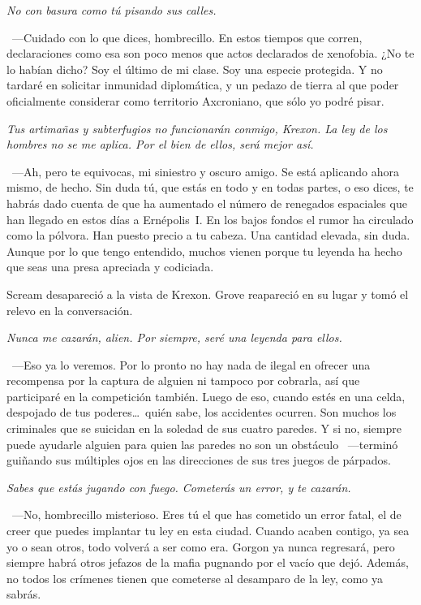 \emph{No con basura como tú pisando sus calles.}

~---Cuidado con lo que dices, hombrecillo. En estos tiempos que corren, declaraciones como esa son poco menos que actos declarados de xenofobia. ¿No te lo habían dicho? Soy el último de mi clase. Soy una especie protegida. Y no tardaré en solicitar inmunidad diplomática, y un pedazo de tierra al que poder oficialmente considerar como territorio Axcroniano, que sólo yo podré pisar.

\emph{Tus artimañas y subterfugios no funcionarán conmigo, Krexon. La ley de los hombres no se me aplica. Por el bien de ellos, será mejor así.}

~---Ah, pero te equivocas, mi siniestro y oscuro amigo. Se está aplicando ahora mismo, de hecho. Sin duda tú, que estás en todo y en todas partes, o eso dices, te habrás dado cuenta de que ha aumentado el número de renegados espaciales que han llegado en estos días a Ernépolis~I. En los bajos fondos el rumor ha circulado como la pólvora. Han puesto precio a tu cabeza. Una cantidad elevada, sin duda. Aunque por lo que tengo entendido, muchos vienen porque tu leyenda ha hecho que seas una presa apreciada y codiciada.

Scream desapareció a la vista de Krexon. Grove reapareció en su lugar y tomó el relevo en la conversación.

\emph{Nunca me cazarán, alien. Por siempre, seré una leyenda para ellos.}

~---Eso ya lo veremos. Por lo pronto no hay nada de ilegal en ofrecer una recompensa por la captura de alguien ni tampoco por cobrarla, así que participaré en la competición también. Luego de eso, cuando estés en una celda, despojado de tus poderes\dots\ quién sabe, los accidentes ocurren. Son muchos los criminales que se suicidan en la soledad de sus cuatro paredes. Y si no, siempre puede ayudarle alguien para quien las paredes no son un obstáculo ~---terminó guiñando sus múltiples ojos en las direcciones de sus tres juegos de párpados.

\emph{Sabes que estás jugando con fuego. Cometerás un error, y te cazarán.}

~---No, hombrecillo misterioso. Eres tú el que has cometido un error fatal, el de creer que puedes implantar tu ley en esta ciudad. Cuando acaben contigo, ya sea yo o sean otros, todo volverá a ser como era. Gorgon ya nunca regresará, pero siempre habrá otros jefazos de la mafia pugnando por el vacío que dejó. Además, no todos los crímenes tienen que cometerse al desamparo de la ley, como ya sabrás.

